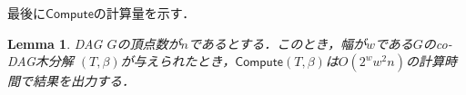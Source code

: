 \documentclass[master]{kuisthesis}		%
\theoremstyle{plain}
\newtheorem{lemma}{Lemma}
\theoremstyle{definition}
\begin{document}

最後に$\mathsf{Compute}$の計算量を示す．

\begin{lemma}
    DAG $G$の頂点数が$n$であるとする．このとき，幅が$w$である$G$のco-DAG木分解 $(T, \beta)$が与えられたとき，$\mathsf{Compute}(T, \beta)$は$O(2^ww^2n)$の計算時間で結果を出力する．
\end{lemma}
\end{document}
